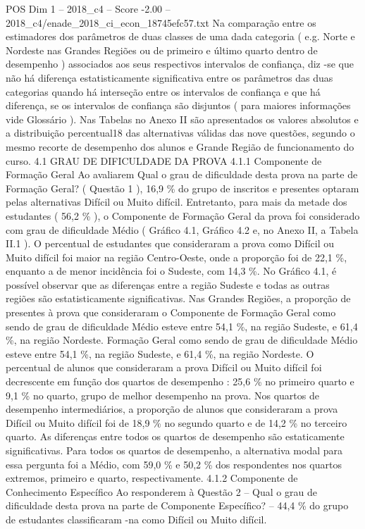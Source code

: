 \begin{textsample}{POS Dim 1 – 2018\_c4 – Score -2.00 – 2018\_c4/enade\_2018\_ci\_econ\_18745efc57.txt}
Na comparação entre os estimadores dos parâmetros de duas classes de uma dada categoria ( e.g.
Norte e Nordeste nas Grandes Regiões ou de primeiro e último quarto dentro de desempenho ) associados aos seus respectivos intervalos de confiança, diz -se que não há diferença estatisticamente significativa entre os parâmetros das duas categorias quando há interseção entre os intervalos de confiança e que há diferença, se os intervalos de confiança são disjuntos ( para maiores informações vide Glossário ).
Nas Tabelas no Anexo II são apresentados os valores absolutos e a distribuição percentual18 das alternativas válidas das nove questões, segundo o mesmo recorte de desempenho dos alunos e Grande Região de funcionamento do curso. 4.1 GRAU DE DIFICULDADE DA PROVA 4.1.1 Componente de Formação Geral Ao avaliarem Qual o grau de dificuldade desta prova na parte de Formação Geral? ( Questão 1 ), 16,9 \% do grupo de inscritos e presentes optaram pelas alternativas Difícil ou Muito difícil.
Entretanto, para mais da metade dos estudantes ( 56,2 \% ), o Componente de Formação Geral da prova foi considerado com grau de dificuldade Médio ( Gráfico 4.1, Gráfico 4.2 e, no Anexo II, a Tabela II.1 ).
O percentual de estudantes que consideraram a prova como Difícil ou Muito difícil foi maior na região Centro-Oeste, onde a proporção foi de 22,1 \%, enquanto a de menor incidência foi o Sudeste, com 14,3 \%.
No Gráfico 4.1, é possível observar que as diferenças entre a região Sudeste e todas as outras regiões são estatisticamente significativas.
Nas Grandes Regiões, a proporção de presentes à prova que consideraram o Componente de Formação Geral como sendo de grau de dificuldade Médio esteve entre 54,1 \%, na região Sudeste, e 61,4 \%, na região Nordeste.
Formação Geral como sendo de grau de dificuldade Médio esteve entre 54,1 \%, na região Sudeste, e 61,4 \%, na região Nordeste.
O percentual de alunos que consideraram a prova Difícil ou Muito difícil foi decrescente em função dos quartos de desempenho : 25,6 \% no primeiro quarto e 9,1 \% no quarto, grupo de melhor desempenho na prova.
Nos quartos de desempenho intermediários, a proporção de alunos que consideraram a prova Difícil ou Muito difícil foi de 18,9 \% no segundo quarto e de 14,2 \% no terceiro quarto.
As diferenças entre todos os quartos de desempenho são estaticamente significativas.
Para todos os quartos de desempenho, a alternativa modal para essa pergunta foi a Médio, com 59,0 \% e 50,2 \% dos respondentes nos quartos extremos, primeiro e quarto, respectivamente. 4.1.2 Componente de Conhecimento Específico Ao responderem à Questão 2 – Qual o grau de dificuldade desta prova na parte de Componente Específico? – 44,4 \% do grupo de estudantes classificaram -na como Difícil ou Muito difícil.

\end{textsample}
